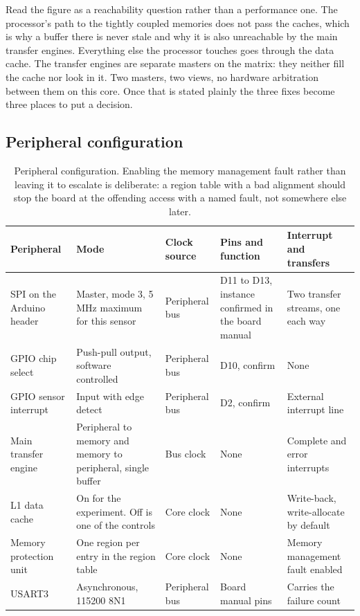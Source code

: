Read the figure as a reachability question rather than a performance one. The
processor's path to the tightly coupled memories does not pass the caches, which
is why a buffer there is never stale and why it is also unreachable by the main
transfer engines. Everything else the processor touches goes through the data
cache. The transfer engines are separate masters on the matrix: they neither
fill the cache nor look in it. Two masters, two views, no hardware arbitration
between them on this core. Once that is stated plainly the three fixes become
three places to put a decision.

\subsection*{Peripheral configuration}

\begin{table}[H]\centering\small
\begin{tabular}{p{22mm}p{26mm}p{24mm}p{30mm}p{30mm}}
\toprule
Peripheral & Mode & Clock source & Pins and function & Interrupt and transfers \\
\midrule
SPI on the Arduino header & Master, mode 3, 5 MHz maximum for this sensor & Peripheral bus & D11 to D13, instance confirmed in the board manual & Two transfer streams, one each way \\
GPIO chip select & Push-pull output, software controlled & Peripheral bus & D10, confirm & None \\
GPIO sensor interrupt & Input with edge detect & Peripheral bus & D2, confirm & External interrupt line \\
Main transfer engine & Peripheral to memory and memory to peripheral, single buffer & Bus clock & None & Complete and error interrupts \\
L1 data cache & On for the experiment. Off is one of the controls & Core clock & None & Write-back, write-allocate by default \\
Memory protection unit & One region per entry in the region table & Core clock & None & Memory management fault enabled \\
USART3 & Asynchronous, 115200 8N1 & Peripheral bus & Board manual pins & Carries the failure count \\
\bottomrule
\end{tabular}
\caption{Peripheral configuration. Enabling the memory management fault rather than leaving it to escalate is deliberate: a region table with a bad alignment should stop the board at the offending access with a named fault, not somewhere else later.}
\end{table}

